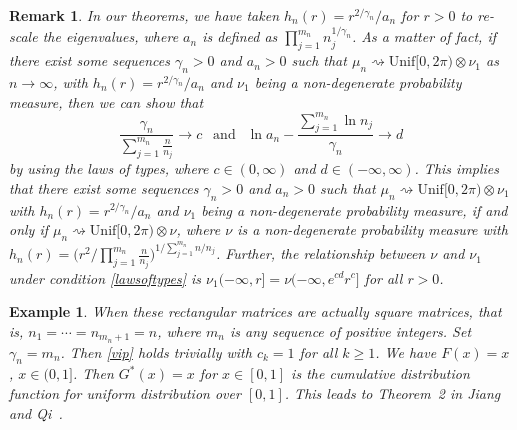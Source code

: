 \documentclass[11pt]{article}
\newtheorem{exm}{\textbf{Example}}
\newtheorem{rem}{\textbf{Remark}}
\numberwithin{equation}{section}
\begin{document}
\begin{rem}
 In our theorems, we have taken $h_n(r)={r}^{2/\gamma_n}/a_n$ for
$r>0$ to re-scale the eigenvalues, where $a_n$ is defined as
$\prod^{m_n}_{j=1}n_j^{1/\gamma_n}$.  As a matter of fact, if there
exist some sequences $\gamma_n>0$ and $a_n>0$ such that $\mu_n
\rightsquigarrow \mathrm{Unif}[0,2 \pi)\otimes \nu_1$ as $n\to
    \infty$, with $h_n(r)={r}^{2/\gamma_n}/a_n$ and $\nu_1$ being a non-degenerate probability measure, then we can show that
    \begin{equation}\label{lawsoftypes}
    \frac{\gamma_n}{\sum^{m_n}_{j=1}\frac{n}{n_j}}\to
    c~~\mbox{ and }~~\ln  a_n-\frac{\sum^{m_n}_{j=1}\ln  n_j}{\gamma_n}\to d
    \end{equation}
by using the laws of types, where $c\in (0,\infty)$ and $d\in
(-\infty, \infty)$. This implies that there exist some sequences
$\gamma_n>0$ and $a_n>0$ such that $\mu_n \rightsquigarrow
\mathrm{Unif}[0,2 \pi)\otimes \nu_1$ with
$h_n(r)={r}^{2/\gamma_n}/a_n$ and $\nu_1$ being a non-degenerate
probability measure, if and only if $\mu_n \rightsquigarrow
\mathrm{Unif}[0,2 \pi)\otimes \nu$,
 where $\nu$ is a non-degenerate
probability measure with
$h_n(r)=\big(r^2/\prod^{m_n}_{j=1}\frac{n}{n_j}\big)^{1/\sum^{m_n}_{j=1}n/n_j}$.
Further, the relationship between $\nu$ and $\nu_1$ under condition
\eqref{lawsoftypes} is $\nu_1(-\infty, r]=\nu(-\infty, e^{cd}r^{c}]$
for all $r>0$.


\end{rem}


\begin{exm}\label{exm1}
When these rectangular matrices are actually square matrices, that
is,  $n_1=\cdots=n_{m_n+1}=n$, where $m_n$ is any sequence of
positive integers. Set $\gamma_n=m_n$.  Then \eqref{vip} holds
trivially with $c_k=1$ for all $k\ge 1$.  We have $F(x)=x$, $x\in
(0,1]$. Then $G^*(x)=x$ for $x\in [0,1]$ is the cumulative
distribution function for uniform distribution over $[0,1]$.  This
leads to Theorem~2 in Jiang and Qi~\cite{JiangQi2019}.
\end{exm}
\end{document}
